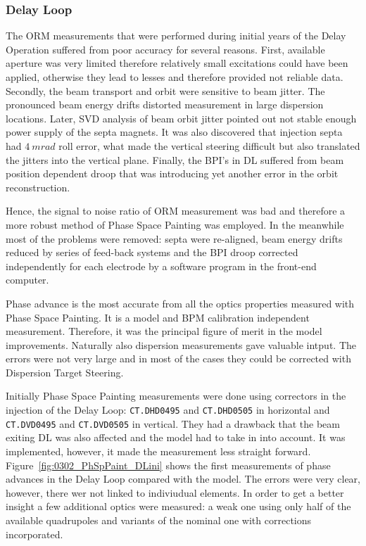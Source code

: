 \subsubsection{Delay Loop}

The ORM measurements that were performed during initial years of 
the Delay Operation suffered from poor accuracy for several reasons. 
First, available aperture was very limited therefore relatively
small excitations could have been applied, otherwise they lead to lesses 
and therefore provided not reliable data. Secondly, the beam transport and 
orbit were sensitive to beam jitter. The pronounced beam energy drifts distorted
measurement in large dispersion locations. Later, SVD analysis of beam orbit
jitter pointed out not stable enough power supply of the septa magnets.
It was also discovered that injection septa had $4~mrad$ roll error, 
what made the vertical steering difficult but also translated the jitters 
into the vertical plane.
Finally, the BPI's in DL suffered from beam position dependent droop that 
was introducing yet another error in the orbit reconstruction. 

Hence, the signal to noise ratio of ORM measurement was bad and therefore 
a more robust method of Phase Space Painting was employed. 
In the meanwhile most of the problems were removed: septa were re-aligned,
beam energy drifts reduced by series of feed-back systems and the BPI droop
corrected independently for each electrode by a software program 
in the front-end computer.

Phase advance is the most accurate from all the optics properties measured
with Phase Space Painting. It is a model and BPM calibration independent measurement.
Therefore, it was the principal figure of merit in the model improvements. 
Naturally also dispersion measurements gave valuable intput.
The errors were not very large and in most of the cases they could be corrected with
Dispersion Target Steering.


Initially Phase Space Painting measurements were done using correctors in the injection
of the Delay Loop: \texttt{CT.DHD0495} and \texttt{CT.DHD0505} in horizontal
and \texttt{CT.DVD0495} and \texttt{CT.DVD0505} in vertical.
They had a drawback that the beam exiting DL was also affected and the model
had to take in into account. It was implemented, however, it made the measurement
less straight forward. Figure~\ref{fig:0302_PhSpPaint_DLini} shows 
the first measurements of phase advances in the Delay Loop compared with the model. 
The errors were very clear, however, there wer not linked to indiviudual elements. 
In order to get a better insight a few additional optics were measured: 
a weak one using only half of the available quadrupoles and 
variants of the nominal one with corrections incorporated.

